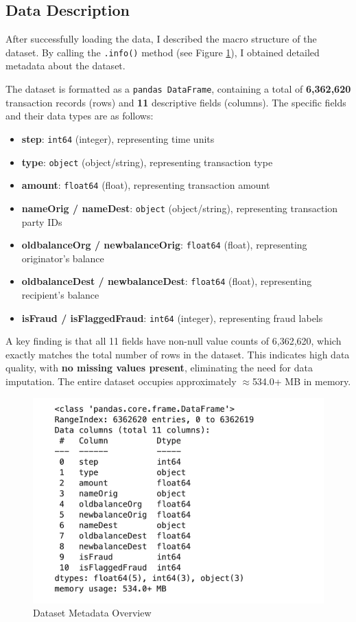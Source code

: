 \documentclass[sigplan,screen]{acmart}
\begin{document}
\subsection{Data Description}

After successfully loading the data, I described the macro structure of the dataset. By calling the \texttt{.info()} method (see Figure \ref{fig:data_info}), I obtained detailed metadata about the dataset.

The dataset is formatted as a \texttt{pandas DataFrame}, containing a total of \textbf{6,362,620} transaction records (rows) and \textbf{11} descriptive fields (columns). The specific fields and their data types are as follows:

\begin{itemize}
\item \textbf{step}: \texttt{int64} (integer), representing time units
\item \textbf{type}: \texttt{object} (object/string), representing transaction type  
\item \textbf{amount}: \texttt{float64} (float), representing transaction amount
\item \textbf{nameOrig / nameDest}: \texttt{object} (object/string), representing transaction party IDs
\item \textbf{oldbalanceOrg / newbalanceOrig}: \texttt{float64} (float), representing originator's balance
\item \textbf{oldbalanceDest / newbalanceDest}: \texttt{float64} (float), representing recipient's balance
\item \textbf{isFraud / isFlaggedFraud}: \texttt{int64} (integer), representing fraud labels
\end{itemize}

A key finding is that all 11 fields have non-null value counts of 6,362,620, which exactly matches the total number of rows in the dataset. This indicates high data quality, with \textbf{no missing values present}, eliminating the need for data imputation. The entire dataset occupies approximately $\approx$534.0+ MB in memory.

\begin{figure}[h!]
    \centering
    \includegraphics[width=0.9\columnwidth]{2.2.png}
    \caption{Dataset Metadata Overview}
    \label{fig:data_info}
\end{figure}
\end{document}
